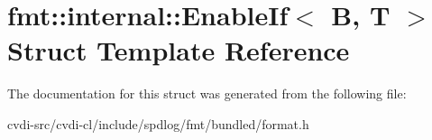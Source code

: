 \hypertarget{structfmt_1_1internal_1_1EnableIf}{}\section{fmt\+:\+:internal\+:\+:Enable\+If$<$ B, T $>$ Struct Template Reference}
\label{structfmt_1_1internal_1_1EnableIf}


The documentation for this struct was generated from the following file\+:\begin{DoxyCompactItemize}
\item 
cvdi-\/src/cvdi-\/cl/include/spdlog/fmt/bundled/format.\+h\end{DoxyCompactItemize}
